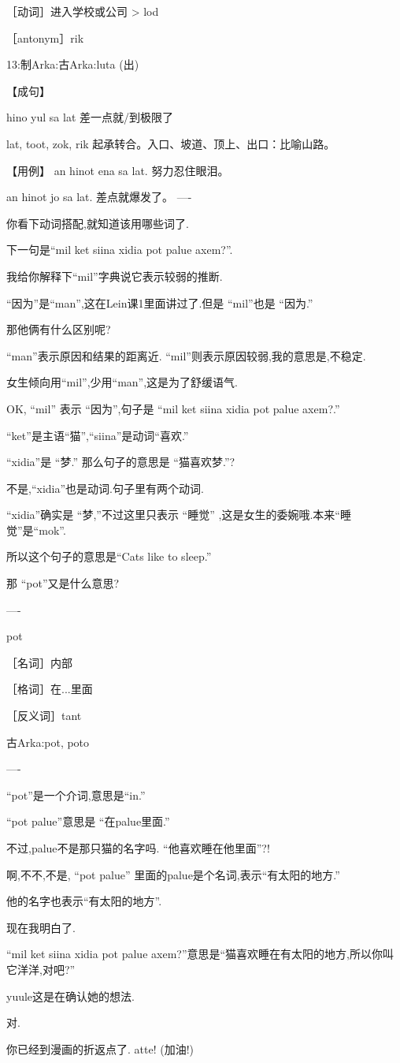 ［动词］进入学校或公司 > lod

［antonym］rik

13:制Arka:古Arka:luta (出)

【成句】

hino yul sa lat 差一点就/到极限了

lat, toot, zok, rik 起承转合。入口、坡道、顶上、出口：比喻山路。

【用例】
an hinot ena sa lat. 努力忍住眼泪。

an hinot jo sa lat. 差点就爆发了。
----

你看下动词搭配,就知道该用哪些词了.


下一句是``mil ket siina xidia pot palue axem?''.

我给你解释下``mil''字典说它表示较弱的推断.

``因为''是``man'',这在Lein课1里面讲过了.但是 ``mil''也是 ``因为.''


那他俩有什么区别呢?


``man''表示原因和结果的距离近. ``mil''则表示原因较弱,我的意思是,不稳定.

女生倾向用``mil'',少用``man'',这是为了舒缓语气.


OK, ``mil'' 表示 ``因为'',句子是 ``mil ket siina xidia pot palue axem?.''

``ket''是主语``猫'',``siina''是动词``喜欢.''

``xidia''是 ``梦.'' 那么句子的意思是 ``猫喜欢梦.''?


不是,``xidia''也是动词.句子里有两个动词.

``xidia''确实是 ``梦,''不过这里只表示 ``睡觉'' ,这是女生的委婉哦.本来``睡觉''是``mok''.


所以这个句子的意思是``Cats like to sleep.''

那 ``pot''又是什么意思?

----

pot

［名词］内部

［格词］在...里面

［反义词］tant

古Arka:pot, poto

----

``pot''是一个介词,意思是``in.''

``pot palue''意思是 ``在palue里面.''

不过,palue不是那只猫的名字吗. ``他喜欢睡在他里面''?!


啊,不不,不是, ``pot palue'' 里面的palue是个名词,表示``有太阳的地方.''

他的名字也表示``有太阳的地方''.


现在我明白了.

``mil ket siina xidia pot palue axem?''意思是``猫喜欢睡在有太阳的地方,所以你叫它洋洋,对吧?''

yuule这是在确认她的想法.


对.

你已经到漫画的折返点了. atte! (加油!)











